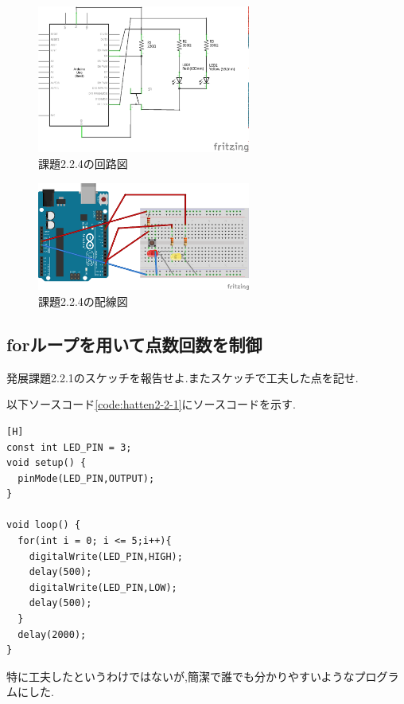 \documentclass{jarticle}
\begin{document}
\begin{figure}[H]
\begin{center}
\includegraphics[width=7.0cm]{images/kadai2-2-4_kairo.png}
\caption{課題2.2.4の回路図}
\label{fig:kadai2-2-4kairo}
\end{center}
\end{figure}

\begin{figure}[H]
\begin{center}
\includegraphics[width=7.0cm]{images/kadai2-2-4_bread.png}
\caption{課題2.2.4の配線図}
\label{fig:kadai2-2-4bread}
\end{center}
\end{figure}

\subsection{forループを用いて点数回数を制御}
発展課題2.2.1のスケッチを報告せよ.またスケッチで工夫した点を記せ.

以下ソースコード\ref{code:hatten2-2-1}にソースコードを示す.

\begin{lstlisting}[caption = 発展2.2.1,label=code:hatten2-2-1][H]
const int LED_PIN = 3;
void setup() {
  pinMode(LED_PIN,OUTPUT);
}

void loop() {
  for(int i = 0; i <= 5;i++){
    digitalWrite(LED_PIN,HIGH);
    delay(500);
    digitalWrite(LED_PIN,LOW);
    delay(500);
  }
  delay(2000);
}
\end{lstlisting}

特に工夫したというわけではないが,簡潔で誰でも分かりやすいようなプログラムにした.
\end{document}
